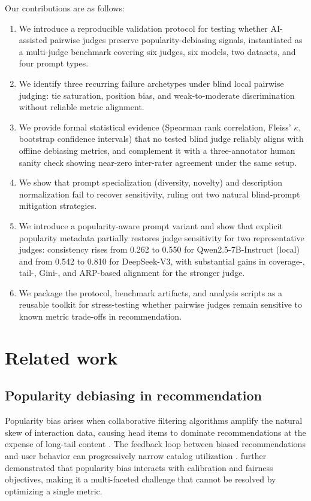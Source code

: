 \documentclass[pdflatex,sn-basic,referee,lineno]{sn-jnl}
\begin{document}
Our contributions are as follows:
\begin{enumerate}
\item We introduce a reproducible validation protocol for testing whether AI-assisted pairwise judges preserve popularity-debiasing signals, instantiated as a multi-judge benchmark covering six judges, six models, two datasets, and four prompt types.
\item We identify three recurring failure archetypes under blind local pairwise judging: tie saturation, position bias, and weak-to-moderate discrimination without reliable metric alignment.
\item We provide formal statistical evidence (Spearman rank correlation, Fleiss' $\kappa$, bootstrap confidence intervals) that no tested blind judge reliably aligns with offline debiasing metrics, and complement it with a three-annotator human sanity check showing near-zero inter-rater agreement under the same setup.
\item We show that prompt specialization (diversity, novelty) and description normalization fail to recover sensitivity, ruling out two natural blind-prompt mitigation strategies.
\item We introduce a popularity-aware prompt variant and show that explicit popularity metadata partially restores judge sensitivity for two representative judges: consistency rises from 0.262 to 0.550 for Qwen2.5-7B-Instruct (local) and from 0.542 to 0.810 for DeepSeek-V3, with substantial gains in coverage-, tail-, Gini-, and ARP-based alignment for the stronger judge.
\item We package the protocol, benchmark artifacts, and analysis scripts as a reusable toolkit for stress-testing whether pairwise judges remain sensitive to known metric trade-offs in recommendation.
\end{enumerate}

\section{Related work}
\label{sec:related_work}

\subsection{Popularity debiasing in recommendation}

Popularity bias arises when collaborative filtering algorithms amplify the natural skew of interaction data, causing head items to dominate recommendations at the expense of long-tail content \citep{chen2023bias,klimashevskaia2024survey}. The feedback loop between biased recommendations and user behavior can progressively narrow catalog utilization \citep{mansoury2020feedback}. \citet{abdollahpouri2020popularity} further demonstrated that popularity bias interacts with calibration and fairness objectives, making it a multi-faceted challenge that cannot be resolved by optimizing a single metric.
\end{document}
